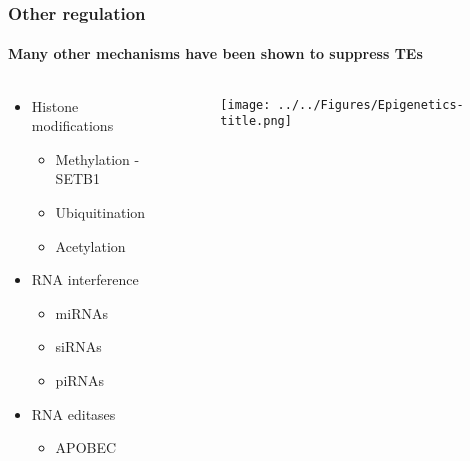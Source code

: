 \documentclass{beamer}
\begin{document}
		\begin{frame} %
			
			\frametitle{Other regulation}
			\framesubtitle{Many other mechanisms have been shown to suppress TEs}
			\begin{columns}
				\begin{column}{0.4\linewidth}
					\begin{itemize}
						\item Histone modifications
						\begin{itemize}
							\item Methylation - SETB1
							\item Ubiquitination
							\item Acetylation
						\end{itemize}
						\item RNA interference
						\begin{itemize}
							\item miRNAs
							\item siRNAs
							\item piRNAs
						\end{itemize}
						\item RNA editases
						\begin{itemize}
							\item APOBEC
						\end{itemize}
					\end{itemize}
				\end{column}
				\begin{column}{0.6\linewidth}
					\begin{figure}
						\texttt{[image: ../../Figures/Epigenetics-title.png]}
					\end{figure}
					\end{column}
			\end{columns}
		\end{frame}	
		
%			
		
\end{document}
